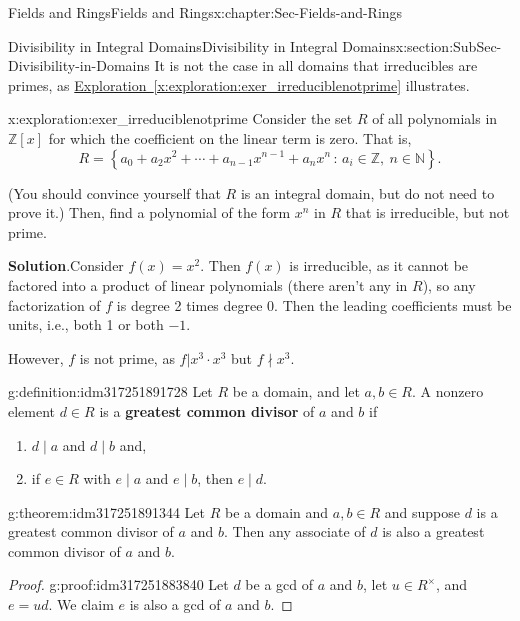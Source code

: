 \documentclass[oneside,10pt,]{book}
\newcommand{\blocktitlefont}{\relax}
\newcommand{\xreffont}{\relax}
\newcommand{\terminology}[1]{\textbf{#1}}
\numberwithin{equation}{section}
\newcommand{\setof}[2]{{\left\{#1\,\colon\,#2\right\}}}
\def\Z{{\mathbb Z}}
\def\N{{\mathbb N}}
\begin{document}
\begin{chapterptx}{Fields and Rings}{}{Fields and Rings}{}{}{x:chapter:Sec-Fields-and-Rings}
\begin{sectionptx}{Divisibility in Integral Domains}{}{Divisibility in Integral Domains}{}{}{x:section:SubSec-Divisibility-in-Domains}
It is not the case in all domains that irreducibles are primes, as \hyperref[x:exploration:exer_irreduciblenotprime]{Exploration~{\xreffont\ref{x:exploration:exer_irreduciblenotprime}}} illustrates.%
\begin{exploration}{}{x:exploration:exer_irreduciblenotprime}%
Consider the set \(R\) of all polynomials in \(\Z[x]\) for which the coefficient on the linear term is zero. That is,%
\begin{equation*}
R = \setof{a_0 + a_2 x^2 + \cdots + a_{n-1} x^{n-1} + a_n x^n}{a_i\in \Z,\ n\in\N}\text{.}
\end{equation*}
%
\par
(You should convince yourself that \(R\) is an integral domain, but do not need to prove it.) Then, find a polynomial of the form \(x^n\) in \(R\) that is irreducible, but not prime.%
\par\smallskip%
\noindent\textbf{\blocktitlefont Solution}.\hypertarget{g:solution:idm317251896304}{}\quad{}Consider \(f(x) = x^2\). Then \(f(x)\) is irreducible, as it cannot be factored into a product of linear polynomials (there aren't any in \(R\)), so any factorization of \(f\) is degree 2 times degree 0. Then the leading coefficients must be units, i.e., both 1 or both \(-1\).%
\par
However, \(f\) is not prime, as \(f| x^3 \cdot x^3\) but \(f\nmid x^3\).%
\end{exploration}
\begin{definition}{}{g:definition:idm317251891728}%
Let \(R\) be a domain, and let \(a,b\in R\). A nonzero element \(d\in R\) is a \terminology{greatest common divisor} of \(a\) and \(b\) if%
\begin{enumerate}
\item{}\(d\mid a\) and \(d\mid b\) and,%
\item{}if \(e\in R\) with \(e\mid a\) and \(e\mid b\), then \(e\mid d\).%
\end{enumerate}
%
\end{definition}
\begin{theorem}{}{}{g:theorem:idm317251891344}%
Let \(R\) be a domain and \(a,b\in R\) and suppose \(d\) is a greatest common divisor of \(a\) and \(b\). Then any associate of \(d\) is also a greatest common divisor of \(a\) and \(b\).%
\end{theorem}
\begin{proof}{}{g:proof:idm317251883840}
Let \(d\) be a gcd of \(a\) and \(b\), let \(u\in R^\times\), and \(e =ud\). We claim \(e\) is also a gcd of \(a\) and \(b\).%

\end{proof}
\end{sectionptx}
\end{chapterptx}
\end{document}
